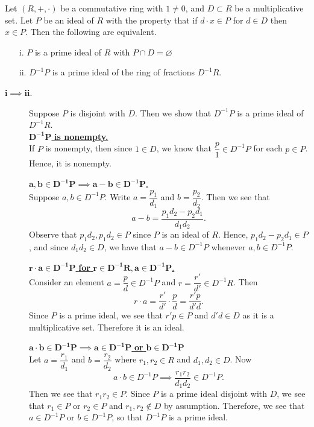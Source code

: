 \documentclass[12pt,letterpaper]{algebra_book}
\theoremstyle{definition}
\begin{document}
\begin{thm}
    Let $(R, +, \cdot)$ be a commutative ring with $1 \ne 0$, and $D
    \subset R$ be a multiplicative set. Let $P$ be an ideal of $R$
    with the property that if $d \cdot x \in P$ for $d \in D$ then $x
    \in P$. Then the following are equivalent.
    \begin{itemize}
        \item[i.] $P$ is a prime ideal of $R$ with $P \cap D = \varnothing$
        \item[ii.] $D^{-1}P$ is a prime ideal of the ring of fractions
    $D^{-1}R$.  
    \end{itemize}
\end{thm}

\begin{prf}
    \begin{description}
        \item[$\bm{i \implies ii}$.]
        Suppose $P$ is disjoint with $D$. Then we show that $D^{-1}P$
        is a prime ideal of $D^{-1}R$.\\
        \noindent\underline{$\bm{D^{-1}P}$\textbf{ is nonempty.}}\\[1.2ex]
        If $P$ is nonempty, then since $1 \in D$, we know that
        $\dfrac{p}{1} \in D^{-1}P$ for each $p \in P$. Hence, it is nonempty.

        \noindent\underline{$\bm{a, b \in D^{-1}P \implies a - b \in D^{-1}P}$.}\\[1.2ex]
        Suppose $a, b \in D^{-1}P$. Write $a = \dfrac{p_1}{d_1}$ and
        $b = \dfrac{p_2}{d_2}$. Then we see that 
        \[
            a - b = \frac{p_1d_2 - p_2d_1}{d_1d_2}.
        \] 
        Observe that $p_1d_2, p_1d_2 \in P$ since $P$ is an ideal of
        $R$. Hence, $p_1d_2 - p_2d_1 \in P$, and since $d_1d_2 \in D$,
        we have that $a - b \in D^{-1}P$ whenever $a, b \in D^{-1}P$.

        \noindent\underline{$\bm{r\cdot a \in D^{-1}P}$ \textbf{ for }
        $\bm{r \in  D^{-1}R, a \in D^{-1}P}$.}\\[1.2ex]
        Consider an element $a = \dfrac{p}{d} \in
        D^{-1}{P}$ and $r = \dfrac{r'}{d'} \in D^{-1}R$. Then 
        \[
            r \cdot a = \frac{r'}{d'} \cdot \frac{p}{d} = \frac{r'p}{d'd}.
        \]
        Since $P$ is a prime ideal, we see that $r'p \in P$ and $d'd
        \in D$ as it is a multiplicative set. Therefore it is an
        ideal. 

        \noindent\underline{$\bm{a\cdot b \in D^{-1}P \implies a \in D^{-1}P}$
        \textbf{or} $\bm{b \in D^{-1}P}$} \\[1.2ex]
        Let $a = \dfrac{r_1}{d_1}$ and $b = \dfrac{r_2}{d_2}$ where
        $r_1,r_2 \in R$ and $d_1,d_2 \in D$. Now 
        \[
            a \cdot b \in D^{-1}P \implies \frac{r_1r_2}{d_1d_2} \in D^{-1}P.
        \] 
        Then we see that $r_1r_2 \in P.$ Since $P$ is a prime ideal
        disjoint with $D$, we see that $r_1 \in P$ or $r_2 \in P$ and
        $r_1,r_2 \not\in D$ by assumption. Therefore, we see that $a
        \in D^{-1}P$ or $b \in D^{-1}P$, so that $D^{-1}P$ is a prime
        ideal. 


\end{description}
\end{prf}
\end{document}
